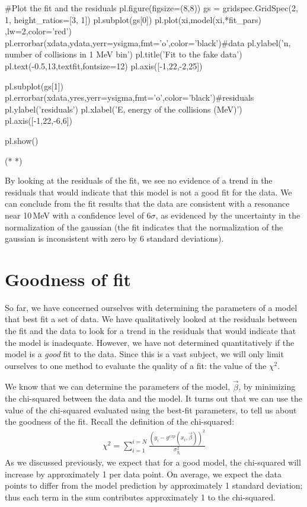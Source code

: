 \begin{python}[caption = Complete non-linear fit with residuals]
#Plot the fit and the residuals
pl.figure(figsize=(8,8))
gs = gridspec.GridSpec(2, 1, height_ratios=[3, 1])
pl.subplot(gs[0])
pl.plot(xi,model(xi,*fit_pars) ,lw=2,color='red')
pl.errorbar(xdata,ydata,yerr=ysigma,fmt='o',color='black')#data
pl.ylabel('n, number of collisions in 1 MeV bin')
pl.title('Fit to the fake data')
pl.text(-0.5,13,textfit,fontsize=12)
pl.axis([-1,22,-2,25])

pl.subplot(gs[1])
pl.errorbar(xdata,yres,yerr=ysigma,fmt='o',color='black')#residuals
pl.ylabel('residuals')
pl.xlabel('E, energy of the collisions (MeV)')
pl.axis([-1,22,-6,6])

pl.show()
\end{python}
\begin{poutput}
(*  *)
\end{poutput}

By looking at the residuals of the fit, we see no evidence of a trend in the residuals that would indicate that this model is not a good fit for the data. We can conclude from the fit results that the data are consistent with a resonance near 10\,MeV with a confidence level of 6$\sigma$, as evidenced by the uncertainty in the normalization of the gaussian (the fit indicates that the normalization of the gaussian is inconsistent with zero by 6 standard deviations).

\section{Goodness of fit}
So far, we have concerned ourselves with determining the parameters of a model that best fit a set of data.  We have qualitatively looked at the residuals between the fit and the data to look for a trend in the residuals that would indicate that the model is inadequate. However, we have not determined quantitatively if the model is a \textit{good} fit to the data. Since this is a vast subject, we will only limit ourselves to one method to evaluate the quality of a fit: the value of the $\chi^2$. 

We know that we can determine the parameters of the model, $\vec\beta$, by minimizing the chi-squared between the data and the model. It turns out that we can use the value of the chi-squared evaluated using the best-fit parameters, to tell us about the goodness of the fit. Recall the definition of the chi-squared:
\begin{align}
\chi^2=\sum_{i=1}^{i=N}\frac{(y_i-y^{exp}(x_i,\vec\beta))^2}{\sigma_{y_i}^2}
\end{align}
As we discussed previously, we expect that for a good model, the chi-squared will increase by approximately 1 per data point. On average, we expect the data points to differ from the model prediction by approximately 1 standard deviation; thus each term in the sum contributes approximately 1 to the chi-squared.

